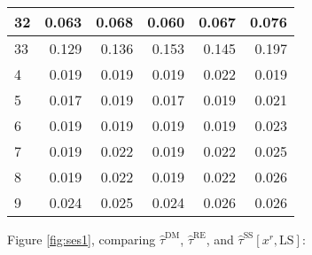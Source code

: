 \documentclass[12pt]{article}\usepackage[]{graphicx}\usepackage[]{xcolor}
\newcommand{\predr}{x^r}
\newcommand{\tsd}{\hat{\tau}^{\mathrm{DM}}}
\newcommand{\tss}{\hat{\tau}^{\mathrm{SS}}}
\newcommand{\trc}{\tss[\predr, \mathrm{LS}]}
\newcommand{\trebar}{\hat{\tau}^{\mathrm{RE}}}
\begin{document}
\begin{table}
\begin{tabular}[t]{l|r|r|r|r|r}
\hline
32 & 0.063 & 0.068 & 0.060 & 0.067 & 0.076\\
\hline
33 & 0.129 & 0.136 & 0.153 & 0.145 & 0.197\\
\hline
4 & 0.019 & 0.019 & 0.019 & 0.022 & 0.019\\
\hline
5 & 0.017 & 0.019 & 0.017 & 0.019 & 0.021\\
\hline
6 & 0.019 & 0.019 & 0.019 & 0.019 & 0.023\\
\hline
7 & 0.019 & 0.022 & 0.019 & 0.022 & 0.025\\
\hline
8 & 0.019 & 0.022 & 0.019 & 0.022 & 0.026\\
\hline
9 & 0.024 & 0.025 & 0.024 & 0.026 & 0.026\\
\hline
\end{tabular}
\end{table}



Figure \ref{fig:ses1}, comparing
$\tsd$,
$\trebar$, and $\trc$:
\end{document}
